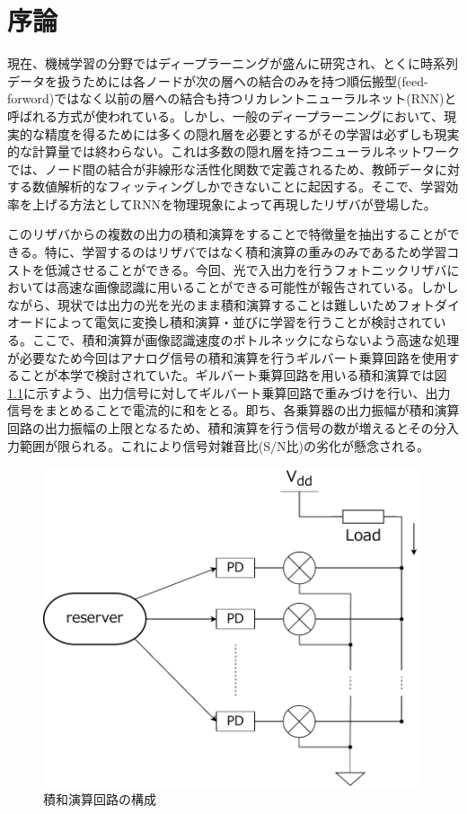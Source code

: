 \chapter{序論}
現在、機械学習の分野ではディープラーニングが盛んに研究され、とくに時系列データを扱うためには各ノードが次の層への結合のみを持つ順伝搬型(feed-forword)ではなく以前の層への結合も持つリカレントニューラルネット(RNN)と呼ばれる方式が使われている。しかし、一般のディープラーニングにおいて、現実的な精度を得るためには多くの隠れ層を必要とするがその学習は必ずしも現実的な計算量では終わらない。これは多数の隠れ層を持つニューラルネットワークでは、ノード間の結合が非線形な活性化関数で定義されるため、教師データに対する数値解析的なフィッティングしかできないことに起因する。そこで、学習効率を上げる方法としてRNNを物理現象によって再現したリザバが登場した。\par
このリザバからの複数の出力の積和演算をすることで特徴量を抽出することができる。特に、学習するのはリザバではなく積和演算の重みのみであるため学習コストを低減させることができる。今回、光で入出力を行うフォトニックリザバにおいては高速な画像認識に用いることができる可能性が報告されている。しかしながら、現状では出力の光を光のまま積和演算することは難しいためフォトダイオードによって電気に変換し積和演算・並びに学習を行うことが検討されている。ここで、積和演算が画像認識速度のボトルネックにならないよう高速な処理が必要なため今回はアナログ信号の積和演算を行うギルバート乗算回路を使用することが本学で検討されていた。ギルバート乗算回路を用いる積和演算では図\ref{fig:1_config}に示すよう、出力信号に対してギルバート乗算回路で重みづけを行い、出力信号をまとめることで電流的に和をとる。即ち、各乗算器の出力振幅が積和演算回路の出力振幅の上限となるため、積和演算を行う信号の数が増えるとその分入力範囲が限られる。これにより信号対雑音比(S/N比)の劣化が懸念される。
\begin{figure}
        \begin{center}
        \includegraphics[width=0.99\textwidth]{figures/chapter1/config.pdf}
        \caption{積和演算回路の構成}
        \label{fig:1_config}
    \end{center}
\end{figure}
